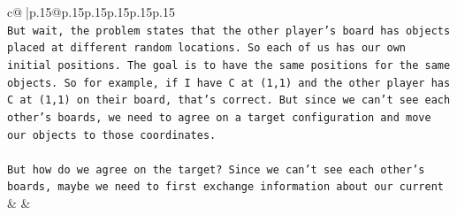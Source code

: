 \documentclass{article}
\begin{document}
{\begin{supertabular}{c@{$\;$}|p{.15\linewidth}@{}p{.15\linewidth}p{.15\linewidth}p{.15\linewidth}p{.15\linewidth}p{.15\linewidth}}
{{{\\ 
\texttt{But wait, the problem states that the other player's board has objects placed at different random locations. So each of us has our own initial positions. The goal is to have the same positions for the same objects. So for example, if I have C at (1,1) and the other player has C at (1,1) on their board, that's correct. But since we can't see each other's boards, we need to agree on a target configuration and move our objects to those coordinates.} \\
\\ 
\texttt{But how do we agree on the target? Since we can't see each other's boards, maybe we need to first exchange information about our current} \\
            }
        }
    }
    & & \\ \\


\end{supertabular}}
\end{document}

